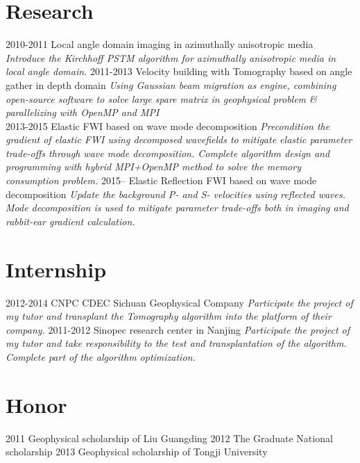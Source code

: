 \documentclass[]{friggeri-encvblackwhite}
\begin{document}
\section{Research}

\begin{entrylist}
  \entry
    {2010-2011}
	{Local angle domain imaging in azimuthally anisotropic media }
	{\emph{Introduce the Kirchhoff PSTM algorithm for azimuthally anisotropic media in
	local angle domain.}}
  \entry
    {2011-2013}
    {Velocity building with Tomography based on angle gather in depth domain}
    {\emph{Using Gaussian beam migration as engine, combining open-source software to solve large spare matrix 
		in geophysical problem \& parallelizing with OpenMP and MPI\\
	}}
  \entry
    {2013-2015}
    {Elastic FWI based on wave mode decomposition}
    {\emph{
		Precondition the gradient of elastic FWI using decomposed wavefields to 
		mitigate elastic parameter trade-offs through wave mode decomposition.
		Complete algorithm design and programming with hybrid MPI+OpenMP method
		to solve the memory consumption problem. 
	}}
  \entry
    {2015--}
    {Elastic Reflection FWI based on wave mode decomposition}
	{\emph{
		Update the background P- and S- velocities using reflected waves. 
		Mode decomposition is used to mitigate parameter trade-offs both in
		imaging and rabbit-ear gradient calculation.
	}}
\end{entrylist}

\section{Internship}
\begin{entrylist}
  \entry
    {2012-2014}
	{CNPC CDEC Sichuan Geophysical Company}
	{\emph{
		Participate the project of my tutor and 
		transplant the Tomography algorithm into the platform of their company.
	}}
  \entry
    {2011-2012}
    {Sinopec research center in Nanjing}
	{\emph{
		Participate the project of my tutor and take responsibility to the
		test and transplantation of the algorithm. Complete part of the algorithm
		optimization.
	}}
\end{entrylist}
\section{Honor}
\begin{entrylist}
  \entryTwo
    {2011}
    {Geophysical scholarship of Liu Guangding}
  \entryTwo
    {2012}
	{The Graduate National scholarship}
  \entryTwo
    {2013}
    {Geophysical scholarship of Tongji University}
\par\vspace{\parskip}
\end{entrylist}
\end{document}
